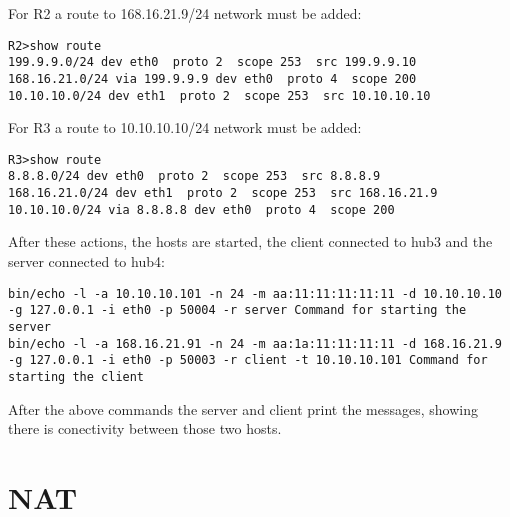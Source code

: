 {{For R2 a route to 168.16.21.9/24 network must be added:
\lstset{language=TeX, caption=R2 routing table}
\begin{lstlisting}
R2>show route  
199.9.9.0/24 dev eth0  proto 2  scope 253  src 199.9.9.10 
168.16.21.0/24 via 199.9.9.9 dev eth0  proto 4  scope 200 
10.10.10.0/24 dev eth1  proto 2  scope 253  src 10.10.10.10
\end{lstlisting}

For R3 a route to 10.10.10.10/24 network must be added:
\lstset{language=TeX, caption=R3 routing table}
\begin{lstlisting}
R3>show route  
8.8.8.0/24 dev eth0  proto 2  scope 253  src 8.8.8.9 
168.16.21.0/24 dev eth1  proto 2  scope 253  src 168.16.21.9 
10.10.10.0/24 via 8.8.8.8 dev eth0  proto 4  scope 200
\end{lstlisting}

After these actions, the hosts are started, the client connected to hub3 and the server connected to hub4:
\lstset{language=TeX, caption=Commands issued for starting client and server}
\begin{lstlisting}
bin/echo -l -a 10.10.10.101 -n 24 -m aa:11:11:11:11:11 -d 10.10.10.10 -g 127.0.0.1 -i eth0 -p 50004 -r server Command for starting the server
bin/echo -l -a 168.16.21.91 -n 24 -m aa:1a:11:11:11:11 -d 168.16.21.9 -g 127.0.0.1 -i eth0 -p 50003 -r client -t 10.10.10.101 Command for starting the client
\end{lstlisting}
After the above commands the server and client print the messages, showing there is conectivity between those two hosts.
\section{NAT}
\label{sub-sec:nat-impl}

}}
